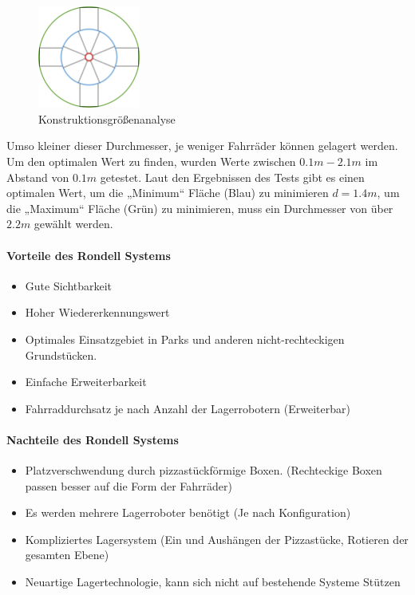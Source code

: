 \begin{figure}[!ht]
  \centering
  \includegraphics[width=0.3\textwidth]{images/konstruktionsgrößen.png}
  \caption{Konstruktionsgrößenanalyse}
  \label{fig:rondell_durchmesser}
\end{figure}

Umso kleiner dieser Durchmesser, je weniger Fahrräder können gelagert werden. Um den optimalen Wert zu finden, wurden Werte zwischen $0.1m-2.1m$ im Abstand von $0.1m$ getestet. Laut den Ergebnissen des Tests gibt es einen optimalen Wert, um die „Minimum“ Fläche (Blau) zu minimieren $d=1.4m$, um die „Maximum“ Fläche (Grün) zu minimieren, muss ein Durchmesser von über $2.2m$ gewählt werden.

\paragraph{Vorteile des Rondell Systems}
\begin{itemize}
  \item Gute Sichtbarkeit
  \item Hoher Wiedererkennungswert
  \item Optimales Einsatzgebiet in Parks und anderen nicht-rechteckigen Grundstücken.
  \item Einfache Erweiterbarkeit
  \item Fahrraddurchsatz je nach Anzahl der Lagerrobotern (Erweiterbar)
\end{itemize}

\paragraph{Nachteile des Rondell Systems}
\begin{itemize}
  \item Platzverschwendung durch pizzastückförmige Boxen. (Rechteckige Boxen passen besser auf die Form der Fahrräder)
  \item Es werden mehrere Lagerroboter benötigt (Je nach Konfiguration)
  \item Kompliziertes Lagersystem (Ein und Aushängen der Pizzastücke, Rotieren der gesamten Ebene)
  \item Neuartige Lagertechnologie, kann sich nicht auf bestehende Systeme Stützen
\end{itemize}
